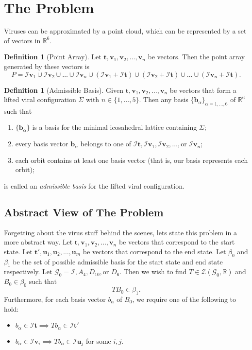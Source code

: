 \documentclass[a4paper,10pt]{article}
\theoremstyle{plain}
\theoremstyle{definition}
\newtheorem{Definition}[Theorem]{Definition}
\theoremstyle{remark}
\newcommand{\R}{\mathbb{R}}
\renewcommand{\vec}[1]{\textbf{#1}}
\begin{document}
\section{The Problem}
Viruses can be approximated by a point cloud, which can be represented by a set of vectors in \(\R^6\).
\begin{Definition}[Point Array]
    Let \(\vec{t}, \vec{v}_1, \vec{v}_2, \dots, \vec{v}_n\) be vectors.
    Then the point array generated by these vectors is \[P = \mathcal{I}\vec{v}_1 \cup \mathcal{I}\vec{v}_2 \cup \dots \cup \mathcal{I}\vec{v}_n \cup (\mathcal{I}\vec{v}_1 + \mathcal{I}\vec{t}) \cup (\mathcal{I}\vec{v}_2 + \mathcal{I}\vec{t}) \cup \dots \cup (\mathcal{I}\vec{v}_n + \mathcal{I}\vec{t}).\]
\end{Definition}
\begin{Definition}[Admissible Basis]
    Given \(\vec{t}, \vec{v}_1, \vec{v}_2, \dots, \vec{v}_n\) be vectors that form a lifted viral configuration \(\Sigma\) with \(n \in \{1, \dots, 5\}\).
    Then any basis \(\{\vec{b}_\alpha\}_{\alpha = 1, \dots, 6}\) of \(\R^6\) such that
    \begin{enumerate}
        \item \(\{\vec{b}_\alpha\}\) is a basis for the minimal icosahedral lattice containing \(\Sigma\);
        \item every basis vector \(\vec{b}_\alpha\) belongs to one of \(\mathcal{I}\vec{t}, \mathcal{I}\vec{v}_1, \mathcal{I}\vec{v}_2, \dots, \text{or } \mathcal{I}\vec{v}_n\);
        \item each orbit contains at least one basis vector (that is, our basis represents each orbit);
    \end{enumerate}
    is called an \emph{admissible basis} for the lifted viral configuration.
\end{Definition}

\subsection{Abstract View of The Problem}
Forgetting about the virus stuff behind the scenes, lets state this problem in a more abstract way.
Let \(\vec{t}, \vec{v}_1, \vec{v}_2, \dots, \vec{v}_n\) be vectors that correspond to the start state.
Let \(\vec{t}', \vec{u}_1, \vec{u}_2, \dots, \vec{u}_m\) be vectors that correspond to the end state.
Let \(\beta_0\) and \(\beta_1\) be the set of possible admissible basis for the start state and end state respectively.
Let \(\mathcal{G}_0 = \mathcal{I}, A_4, D_{10}, \text{or } D_6\).
Then we wish to find \(T \in \mathcal{Z}(\mathcal{G}_0, \R)\) and \(B_0 \in \beta_0\) such that \[TB_0 \in \beta_1.\]
Furthermore, for each basis vector \(b_\alpha\) of \(B_0\), we require one of the following to hold:
\begin{itemize}
    \item \(b_\alpha \in \mathcal{I}\vec{t} \implies Tb_\alpha \in \mathcal{I}\vec{t}'\)
    \item \(b_\alpha \in \mathcal{I}\vec{v}_i \implies Tb_\alpha \in \mathcal{I}\vec{u}_j\) for some \(i, j\).
\end{itemize}
\end{document}
